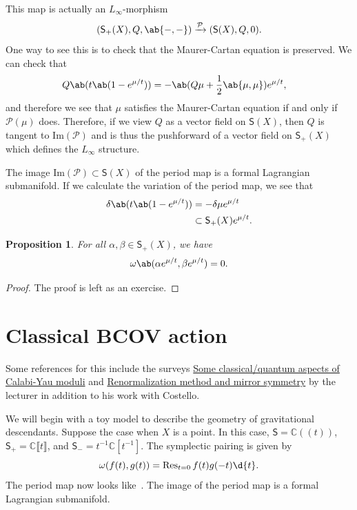 \documentclass{amsart}
\newtheorem{prop}[thm]{Proposition}
\theoremstyle{definition}
\theoremstyle{remark}
\theoremstyle{plain}
\theoremstyle{definition}
\theoremstyle{remark}
\newcommand{\Ima}{\mathrm{Im}}
\newcommand{\C}{\mathbb{C}}
\newcommand{\mc}[1]{\mathcal{#1}}
\newcommand{\on}[1]{\operatorname{#1}}
\newcommand{\ms}[1]{\mathsf{#1}}
\newcommand{\1}{\mathbf{1}}
\newcommand{\2}{\mathbf{2}}
\newcommand{\3}{\mathbf{3}}
\newcommand{\ps}[1]{\lBrack #1 \rBrack}
\newcommand{\ls}[1]{(\!( #1 )\!)}
\begin{document}
This map is actually an \(L_{\infty}\)-morphism
\[ (\ms{S}_+(X), Q, \ab\{-,-\}) \xrightarrow{\mc{P}}  (\ms{S}(X), Q, 0). \]
One way to see this is to check that the Maurer-Cartan equation is preserved. We can check that 
\begin{align*}
    Q \ab(t \ab(1-e^{\mu/t})) &= -\ab(Q \mu + \frac{1}{2} \ab\{\mu, \mu\}) e^{\mu/t},
\end{align*}
and therefore we see that \(\mu\) satisfies the Maurer-Cartan equation if and only if \(\mc{P}(\mu)\) does. Therefore, if we view \(Q\) as a vector field on \(\ms{S}(X)\), then \(Q\) is tangent to \(\Ima(\mc{P})\) and is thus the pushforward of a vector field on \(\ms{S}_+(X)\) which defines the \(L_{\infty}\) structure.

The image \(\Ima(\mc{P}) \subset \ms{S}(X)\) of the period map is a formal Lagrangian submanifold. If we calculate the variation of the period map, we see that
\begin{align*}
    \delta \ab(t \ab(1-e^{\mu/t})) &= - \delta \mu e^{\mu/t} \\
    &\subset \ms{S}_+(X) e^{\mu/t}.
\end{align*}

\begin{prop}
    For all \(\alpha, \beta \in \ms{S}_+(X)\), we have
    \[ \omega \ab(\alpha e^{\mu/t}, \beta e^{\mu/t}) = 0. \]
\end{prop}

\begin{proof}
    The proof is left as an exercise.
\end{proof}

\section{Classical BCOV action}%
\label{sec:Classical BCOV action}

Some references for this include the surveys \href{https://link.springer.com/content/pdf/10.1007/978-3-319-94220-9_4.pdf}{Some classical/quantum aspects of Calabi-Yau moduli} and \href{https://sigma-journal.com/2012/101/sigma12-101.pdf}{Renormalization method and mirror symmetry} by the lecturer in addition to his work with Costello.

We will begin with a toy model to describe the geometry of gravitational descendants. Suppose the case when \(X\) is a point. In this case, \(\ms{S} = \C \ls{t}\), \(\ms{S}_+ = \C \ps{t}\), and \(\ms{S}_- = t^{-1} \C[t^{-1}]\). The symplectic pairing is given by
\[ \omega(f(t), g(t)) = \on{Res}_{t = 0} f(t) g(-t) \d{t}. \]
The period map now looks like~. The image of the period map is a formal Lagrangian submanifold.
\end{document}
